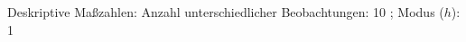 				\label{tableValues:astu03b_g2}
				\vspace*{-\baselineskip}
                    \begin{noten}
                	    \note{} Deskriptive Maßzahlen:
                	    Anzahl unterschiedlicher Beobachtungen: 10%
                	    ; 
                	      Modus ($h$): 1
                     \end{noten}


